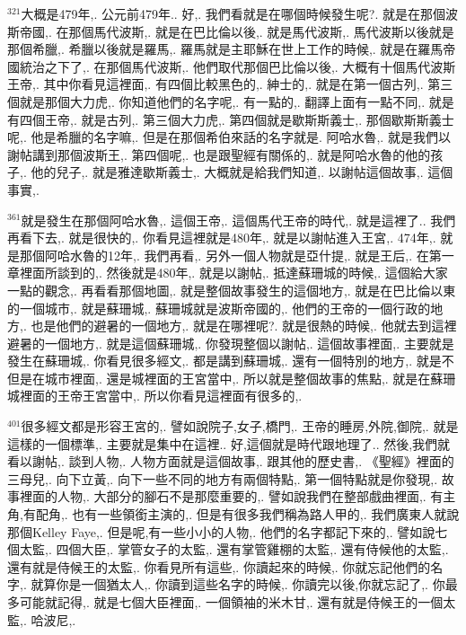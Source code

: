 \documentclass{book}
\begin{document}
$^{321}$大概是479年,.
公元前479年..
好,.
我們看就是在哪個時候發生呢?.
就是在那個波斯帝國,.
在那個馬代波斯,.
就是在巴比倫以後,.
就是馬代波斯,.
馬代波斯以後就是那個希臘,.
希臘以後就是羅馬,.
羅馬就是主耶穌在世上工作的時候,.
就是在羅馬帝國統治之下了,.
在那個馬代波斯,.
他們取代那個巴比倫以後,.
大概有十個馬代波斯王帝,.
其中你看見這裡面,.
有四個比較黑色的,.
紳士的,.
就是在第一個古列,.
第三個就是那個大力虎,.
你知道他們的名字呢,.
有一點的,.
翻譯上面有一點不同,.
就是有四個王帝,.
就是古列,.
第三個大力虎,.
第四個就是歇斯斯義士,.
那個歇斯斯義士呢,.
他是希臘的名字嘛,.
但是在那個希伯來話的名字就是.
阿哈水魯,.
就是我們以謝帖講到那個波斯王,.
第四個呢,.
也是跟聖經有關係的,.
就是阿哈水魯的他的孩子,.
他的兒子,.
就是雅達歇斯義士,.
大概就是給我們知道,.
以謝帖這個故事,.
這個事實,.

$^{361}$就是發生在那個阿哈水魯,.
這個王帝,.
這個馬代王帝的時代,.
就是這裡了..
我們再看下去,.
就是很快的,.
你看見這裡就是480年,.
就是以謝帖進入王宮,.
474年,.
就是那個阿哈水魯的12年,.
我們再看,.
另外一個人物就是亞什提,.
就是王后,.
在第一章裡面所談到的,.
然後就是480年,.
就是以謝帖,.
抵達蘇珊城的時候,.
這個給大家一點的觀念,.
再看看那個地圖,.
就是整個故事發生的這個地方,.
就是在巴比倫以東的一個城市,.
就是蘇珊城,.
蘇珊城就是波斯帝國的,.
他們的王帝的一個行政的地方,.
也是他們的避暑的一個地方,.
就是在哪裡呢?.
就是很熱的時候,.
他就去到這裡避暑的一個地方,.
就是這個蘇珊城,.
你發現整個以謝帖,.
這個故事裡面,.
主要就是發生在蘇珊城,.
你看見很多經文,.
都是講到蘇珊城,.
還有一個特別的地方,.
就是不但是在城市裡面,.
還是城裡面的王宮當中,.
所以就是整個故事的焦點,.
就是在蘇珊城裡面的王帝王宮當中,.
所以你看見這裡面有很多的,.

$^{401}$很多經文都是形容王宮的,.
譬如說院子,女子,橋門,.
王帝的睡房,外院,御院,.
就是這樣的一個標準,.
主要就是集中在這裡..
好,這個就是時代跟地理了..
然後,我們就看以謝帖,.
談到人物,.
人物方面就是這個故事,.
跟其他的歷史書,.
《聖經》裡面的三母兒,.
向下立黃,.
向下一些不同的地方有兩個特點,.
第一個特點就是你發現,.
故事裡面的人物,.
大部分的腳石不是那麼重要的,.
譬如說我們在整部戲曲裡面,.
有主角,有配角,.
也有一些領銜主演的,.
但是有很多我們稱為路人甲的,.
我們廣東人就說那個Kelley Faye,.
但是呢,有一些小小的人物,.
他們的名字都記下來的,.
譬如說七個太監,.
四個大臣,.
掌管女子的太監,.
還有掌管雞棚的太監,.
還有侍候他的太監,.
還有就是侍候王的太監,.
你看見所有這些,.
你讀起來的時候,.
你就忘記他們的名字,.
就算你是一個猶太人,.
你讀到這些名字的時候,.
你讀完以後,你就忘記了,.
你最多可能就記得,.
就是七個大臣裡面,.
一個領袖的米木甘,.
還有就是侍候王的一個太監,.
哈波尼,.
\end{document}
